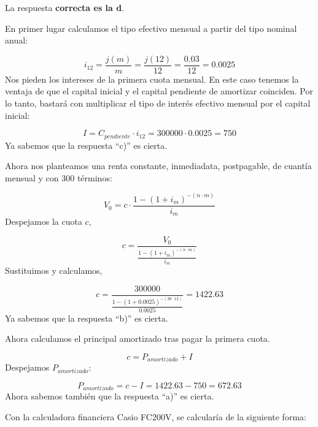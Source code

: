 \documentclass[
  letterpaper,
  DIV=11,
  numbers=noendperiod]{scrreprt}
\begin{document}
\begin{tcolorbox}[enhanced jigsaw, left=2mm, opacityback=0, colback=white, breakable, arc=.35mm, bottomrule=.15mm, rightrule=.15mm, toprule=.15mm, leftrule=.75mm, colframe=quarto-callout-tip-color-frame]
\begin{minipage}[t]{5.5mm}
\textcolor{quarto-callout-tip-color}{\faLightbulb}
\end{minipage}%
\begin{minipage}[t]{\textwidth - 5.5mm}

La respuesta \textbf{correcta es la d}.

En primer lugar calculamos el tipo efectivo mensual a partir del tipo
nominal anual:

\[i_{12}=\frac{j\left(m\right)}{m}=\frac{j\left(12\right)}{12}=\frac{0.03}{12}=0.0025\]
Nos pieden los intereses de la primera cuota mensual. En este caso
tenemos la ventaja de que el capital inicial y el capital pendiente de
amortizar coinciden. Por lo tanto, bastará con multiplicar el tipo de
interés efectivo mensual por el capital inicial:

\[I=C_{pendiente}\cdot i_{12}=300000\cdot0.0025=750\] Ya sabemos que la
respuesta ``c)'' es cierta.

Ahora nos planteamos una renta constante, inmediadata, postpagable, de
cuantía mensual y con 300 términos:

\[V_0=c\cdot\frac{1-\left(1+i_m\right)^{-\left(n\cdot m\right)}}{i_m}\]
Despejamos la cuota \(c\),

\[c=\frac{ V_0}{ \frac{1-\left(1+i_m\right)^{-\left(n\cdot m\right)}}{i_m}}\]
Sustituimos y calculamos,

\[c=\frac{ 300000}{ \frac{1-\left(1+0.0025\right)^{-\left(30\cdot 12\right)}}{0.0025}}=1422.63\]
Ya sabemos que la respuesta ``b)'' es cierta.

Ahora calculamos el principal amortizado tras pagar la primera cuota.

\[c=P_{amortizado}+I\] Despejamos \(P_{amortizado}\):

\[P_{amortizado}=c-I=1422.63-750=672.63\] Ahora sabemos también que la
respuesta ``a)'' es cierta.

Con la calculadora financiera Casio FC200V, se calcularía de la
siguiente forma:


\end{minipage}
\end{tcolorbox}
\end{document}
